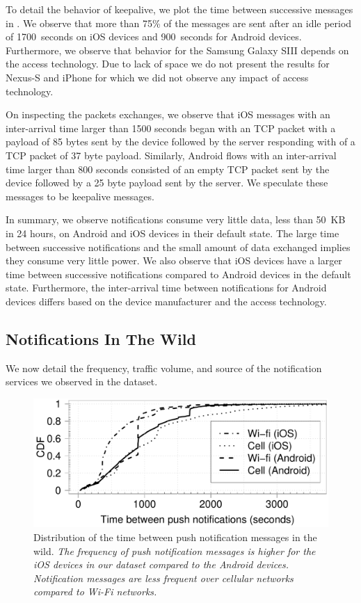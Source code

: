 To detail the behavior of keepalive, we plot the time between successive messages in .
We observe that more than 75\% of the messages are sent after an idle period of 1700~seconds on iOS devices and 900~seconds for Android devices. 
Furthermore, we observe that behavior for the Samsung Galaxy SIII depends on the access technology.
Due to lack of space we do not present the results for Nexus-S and iPhone for which we did not observe any impact of access technology.

On inspecting the packets exchanges, we observe that iOS messages with an inter-arrival time larger than 1500 seconds began with an TCP packet with a payload of 85 bytes sent by the device followed by the server responding with of a TCP packet of 37 byte payload.
Similarly, Android flows with an inter-arrival time larger than 800 seconds consisted of an empty TCP packet sent by the device followed by a 25 byte payload sent by the server.
We speculate these messages to be keepalive messages.

In summary, we observe notifications consume very little data, less than 50~KB in 24 hours, on Android and iOS devices in their default state.
The large time between successive notifications and the small amount of data exchanged implies they consume very little power.
We also observe that iOS devices have a larger time between successive notifications compared to Android devices in the default state. 
Furthermore, the inter-arrival time between notifications for Android devices differs based on the device manufacturer and the access technology. 

\subsection{Notifications In The Wild} 

We now detail the frequency, traffic volume, and source of the notification services we observed in the \mobWild dataset. 

\begin{figure}
\centering
\includegraphics[width=\columnwidth]{plots/push_compare_os_tech_wild_distrib.pdf}
\caption{Distribution of the time between push notification messages in the wild. \emph{The frequency of push notification messages is higher for the iOS devices in our dataset compared to the Android devices. Notification messages are less frequent over cellular networks compared to Wi-Fi networks.}}
\label{fig:push-wild-compare-ostech}
\end{figure}

